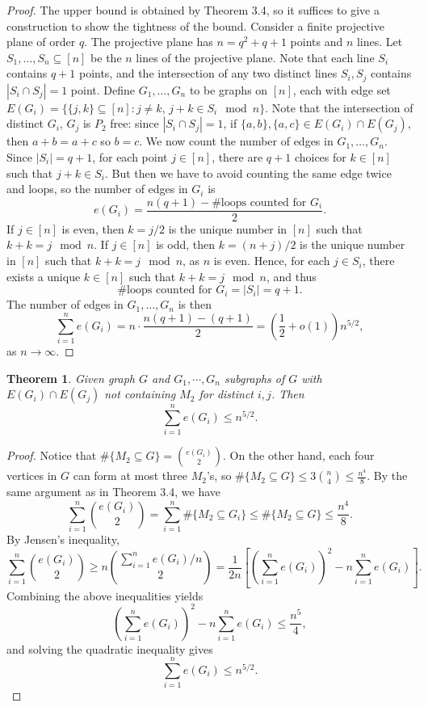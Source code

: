 \documentclass[12pt]{report}
\newtheorem{theorem}{Theorem}[chapter]
\begin{document}
\begin{proof}
  The upper bound is obtained by Theorem 3.4, so it suffices to give a construction to show the
  tightness of the bound. Consider a finite projective plane of order $q$. The projective plane has
  $n = q^2 + q + 1$ points and $n$ lines. Let $S_1, \ldots, S_n \subseteq [n]$ be the $n$ lines of
  the projective plane. Note that each line $S_i$ contains $q + 1$ points, and the intersection of
  any two distinct lines $S_i, S_j$ contains $|S_i \cap S_j| = 1$ point. Define $G_1, \ldots, G_n$
  to be graphs on $[n]$, each with edge set $E(G_i) = \{\{j, k\} \subseteq [n] : j \neq k, \, j + k
  \in S_i \mod n\}$. Note that the intersection of distinct $G_i$, $G_j$ is $P_2$ free: since $|S_i
  \cap S_j| = 1$, if $\{a, b\}, \{a, c\} \in E(G_i) \cap E(G_j)$, then $a + b = a + c$ so $b = c$.
  We now count the number of edges in $G_1, \ldots, G_n$. Since $|S_i| = q + 1$, for each point $j
  \in [n]$, there are $q + 1$ choices for $k \in [n]$ such that $j + k \in S_i$. But then we have to
  avoid counting the same edge twice and loops, so the number of edges in $G_i$ is
  \[
    e(G_i) = \frac{n(q + 1) - \#\text{loops counted for } G_i}{2}.
  \]
  If $j \in [n]$ is even, then $k = j/2$ is the unique number in $[n]$ such that $k + k = j \mod n$.
  If $j \in [n]$ is odd, then $k = (n + j)/2$ is the unique number in $[n]$ such that $k + k = j
  \mod n$, as $n$ is even. Hence, for each $j \in S_i$, there exists a unique $k \in [n]$ such that
  $k + k = j \mod n$, and thus
  \[
    \#\text{loops counted for } G_i = |S_i| = q + 1.
  \]
  The number of edges in $G_1, \ldots, G_n$ is then
  \[
    \sum_{i = 1}^n e(G_i) = n \cdot \frac{n(q + 1) - (q + 1)}{2} = \left(\frac{1}{2} + o(1)\right)n^{5/2},
  \]
  as $n \to \infty$.
\end{proof}

\begin{theorem}
  Given graph $G$ and $G_1, \cdots, G_n$ subgraphs of $G$ with $E(G_i) \cap E(G_j)$ not containing
  $M_2$ for distinct $i, j$. Then
  \[
    \sum_{i = 1}^n e(G_i) \leq n^{5/2}.
  \]
\end{theorem}

\begin{proof}
  Notice that $\#\{M_2 \subseteq G\} = \binom{e(G_i)}{2}$. On the other hand, each four vertices in
  $G$ can form at most three $M_2$'s, so $\#\{M_2 \subseteq G\} \leq 3\binom{n}{4} \leq
  \frac{n^4}{8}$. By the same argument as in Theorem 3.4, we have 
  \[
    \sum_{i = 1}^n \binom{e(G_i)}{2} = \sum_{i = 1}^n \#\{M_2 \subseteq G_i\} \leq \#\{M_2 \subseteq G\} \leq \frac{n^4}{8}.
  \]
  By Jensen's inequality,
  \[
    \sum_{i = 1}^n \binom{e(G_i)}{2} \geq n\binom{\sum_{i = 1}^n e(G_i)/n}{2} = \frac{1}{2n}\left[\left(\sum_{i = 1}^n e(G_i)\right)^2 - n\sum_{i = 1}^n e(G_i)\right].
  \]
  Combining the above inequalities yields
  \[
    \left(\sum_{i = 1}^n e(G_i)\right)^2 - n\sum_{i = 1}^n e(G_i) \leq \frac{n^5}{4},
  \]
  and solving the quadratic inequality gives
  \[
    \sum_{i = 1}^n e(G_i) \leq n^{5/2}.
  \]
\end{proof}
\end{document}

